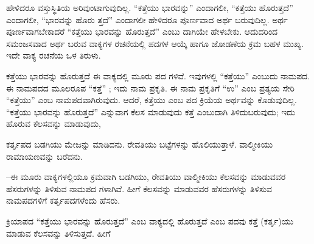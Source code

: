 \kbvcontinued ಹೇಳಿದರೂ ವಸ್ತುಸ್ಥಿತಿಯ ಅರಿವುಂಟಾಗುವುದಿಲ್ಲ. “ಕತ್ತೆಯು ಭಾರವನ್ನು” ಎಂದಾಗಲೀ, “ಕತ್ತೆಯು ಹೊರುತ್ತದೆ” ಎಂದಾಗಲೀ, “ಭಾರವನ್ನು ಹೊರು ತ್ತದೆ” ಎಂದಾಗಲೀ ಹೇಳಿದರೂ ಪೂರ್ಣವಾದ ಅರ್ಥ ಬರುವುದಿಲ್ಲ. ಅರ್ಥ ಪೂರ್ಣವಾಗಬೇಕಾದರೆ “ಕತ್ತೆಯು ಭಾರವನ್ನು ಹೊರುತ್ತದೆ” ಎಂಬು ದಾಗಿಯೇ ಹೇಳಬೇಕು. ಆದುದರಿಂದ ಸಮಂಜಸವಾದ ಅರ್ಥ ಬರುವ ವಾಕ್ಯಗಳ ರಚನೆಯಲ್ಲಿ ಪದಗಳ ಆಯ್ಕೆ ಹಾಗೂ ಜೋಡಣೆಯ ಕ್ರಮ ಬಹಳ ಮುಖ್ಯ. ಇದೇ ವಾಕ್ಯ ರಚನೆಯ ಒಳ ತಿರುಳು.\par


\indent ಕತ್ತೆಯು ಭಾರವನ್ನು ಹೊರುತ್ತದೆ ಈ ವಾಕ್ಯದಲ್ಲಿ ಮೂರು ಪದ ಗಳಿವೆ. ಇವುಗಳಲ್ಲಿ “ಕತ್ತೆಯು” ಎಂಬುದು ನಾಮಪದ. ಈ ನಾಮಪದದ ಮೂಲರೂಪ “ಕತ್ತೆ” ; ಇದು ನಾಮ ಪ್ರಕೃತಿ. ಈ ನಾಮ ಪ್ರಕೃತಿಗೆ “ಉ” ಎಂಬ ಪ್ರತ್ಯಯ ಸೇರಿ “ಕತ್ತೆಯು” ಎಂಬ ನಾಮಪದವಾಗಿರುವುದು. ಆದರೆ, ಕತ್ತೆಯು ಎಂಬ ಪದ ಕ್ರಿಯೆಯ ಅರ್ಥವನ್ನು ಕೊಡುವುದಿಲ್ಲ. “ಕತ್ತೆಯು ಭಾರವನ್ನು ಹೊರುತ್ತದೆ” ಎನ್ನುವಾಗ ಕೆಲಸ ಮಾಡುವುದು ಕತ್ತೆ ಎಂಬುದಾಗಿ ತಿಳಿದುಬರುವುದು; ಇದು ಹೊರುವ ಕೆಲಸವನ್ನು ಮಾಡುವುದು,\par

\vspace{2.5pt plus 3pt minus 0.5pt}\noindent\hspace*{1.2em}\hspace{0.55em}ಕರ್ತೃಪದ ಬಡಗಿಯು ಮೇಜನ್ನು ಮಾಡಿದನು. ರೇವತಿಯು ಬಟ್ಟೆಗಳನ್ನು ಹೊಲಿಯುತ್ತಾಳೆ. ವಾಲ್ಮೀಕಿಯು ರಾಮಾಯಣವನ್ನು ಬರೆದನು.\par

\indent --ಈ ಮೂರು ವಾಕ್ಯಗಳಲ್ಲಿಯೂ ಕ್ರಮವಾಗಿ ಬಡಗಿಯು, ರೇವತಿಯು ವಾಲ್ಮೀಕಿಯು ಕೆಲಸವನ್ನು ಮಾಡುವವರ ಹೆಸರುಗಳನ್ನು ತಿಳಿಸುವ ನಾಮಪದ ಗಳಾಗಿವೆ. ಹೀಗೆ ಕೆಲಸವನ್ನು ಮಾಡುವವರ ಹೆಸರುಗಳನ್ನು ತಿಳಿಸುವ ನಾಮಪದಗಳಿಗೆ ಕರ್ತೃಪದಗಳೆಂದು ಹೆಸರು.\par

\vspace{2.5pt plus 3pt minus 0.5pt}\noindent\hspace*{1.2em}\hspace{0.55em}ಕ್ರಿಯಾಪದ “ಕತ್ತೆಯು ಭಾರವನ್ನು ಹೊರುತ್ತದೆ” ಎಂಬ ವಾಕ್ಯದಲ್ಲಿ ಹೊರುತ್ತದೆ ಎಂಬ ಪದವು ಕತ್ತೆ (ಕರ್ತೃ)ಯು ಮಾಡುವ ಕೆಲಸವನ್ನು ತಿಳಿಸುತ್ತದೆ. ಹೀಗೆ\kbvcontinues
